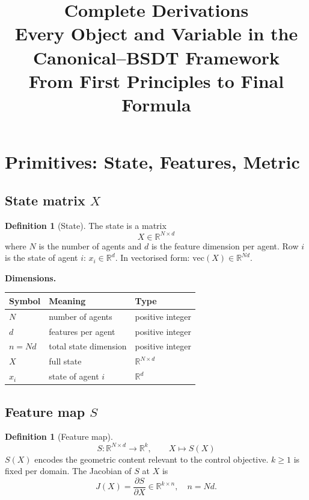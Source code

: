 \documentclass[11pt,a4paper]{article}
\title{\textbf{Complete Derivations}\\[0.4em]
\large Every Object and Variable in the Canonical--BSDT Framework\\[0.2em]
\normalsize From First Principles to Final Formula}
\author{}
\date{}
\theoremstyle{definition}
\newtheorem{definition}[theorem]{Definition}
\newcommand{\R}{\mathbb{R}}
\begin{document}
\maketitle
\tableofcontents
\newpage

\section{Primitives: State, Features, Metric}

\subsection{State matrix $X$}

\begin{definition}[State]
The state is a matrix
\[
X \in \R^{N \times d}
\]
where $N$ is the number of agents and $d$ is the feature dimension per agent.
Row $i$ is the state of agent $i$: $x_i \in \R^d$.
In vectorised form: $\mathrm{vec}(X) \in \R^{Nd}$.
\end{definition}

\textbf{Dimensions.}
\begin{center}
\begin{tabular}{lll}
\toprule
Symbol & Meaning & Type \\
\midrule
$N$ & number of agents & positive integer \\
$d$ & features per agent & positive integer \\
$n = Nd$ & total state dimension & positive integer \\
$X$ & full state & $\R^{N\times d}$ \\
$x_i$ & state of agent $i$ & $\R^d$ \\
\bottomrule
\end{tabular}
\end{center}

\subsection{Feature map $S$}

\begin{definition}[Feature map]
\[
S : \R^{N\times d} \to \R^k, \qquad X \mapsto S(X)
\]
$S(X)$ encodes the geometric content relevant to the control objective.
$k \geq 1$ is fixed per domain.
The Jacobian of $S$ at $X$ is
\[
J(X) = \frac{\partial S}{\partial X} \in \R^{k \times n}, \quad n = Nd.
\]
\end{definition}
\end{document}
